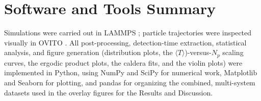 \section{Software and Tools Summary}
\label{sec:3.12}
\hspace{\parindent} Simulations were carried out in LAMMPS \cite{Thompson2022}; particle trajectories were inspected visually in OVITO \cite{Stukowski2010}. All post-processing, detection-time extraction, statistical analysis, and figure generation (distribution plots, the $\langle T \rangle$)-versus-$N_p$ scaling curves, the ergodic product plots, the caldera fits, and the violin plots) were implemented in Python, using NumPy and SciPy for numerical work, Matplotlib and Seaborn for plotting, and pandas for organizing the combined, multi-system datasets used in the overlay figures for the Results and Discussion.

